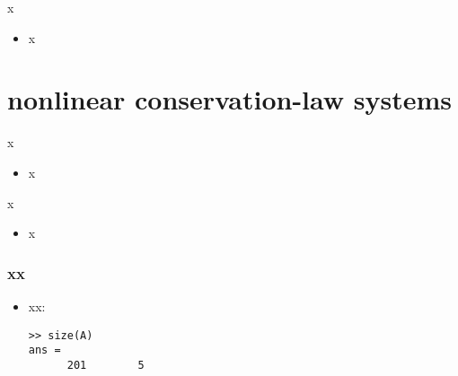 \documentclass[10pt,hyperref]{beamer}
\begin{document}
\begin{frame}{x}

\begin{itemize}
\item x
\end{itemize}
\end{frame}


\section{nonlinear conservation-law systems}

\begin{frame}{x}

\begin{itemize}
\item x
\end{itemize}
\end{frame}


\begin{frame}{x}

\begin{itemize}
\item x
\end{itemize}
\end{frame}


\begin{frame}[fragile]
\frametitle{xx}

\begin{itemize}
\item xx:

\medskip
\begin{Verbatim}[fontsize=\scriptsize]
>> size(A)
ans =
      201        5
\end{Verbatim}

\end{itemize}
\end{frame}
\end{document}
